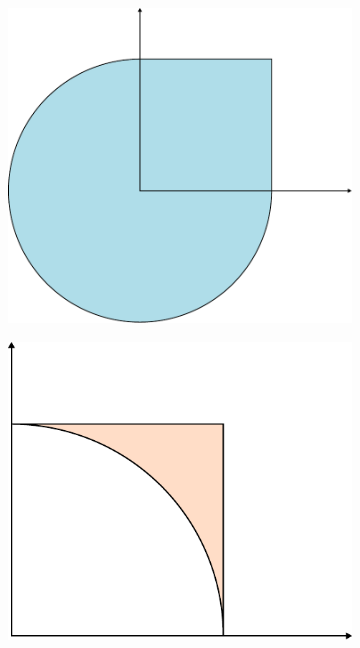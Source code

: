 \documentclass[11pt,a4paper]{article}
\begin{document}
\begin{itemize}
\begin{itemize}
\begin{figure}
\begin{subfigure}[b]{0.24\textwidth}
                \caption{}\label{fig:intersection}
            \end{subfigure}
            \begin{subfigure}[b]{0.24\textwidth}
                \includegraphics[width=\textwidth]{figures/SUD.pdf}
                \caption{}\label{fig:union}
            \end{subfigure}
            \begin{subfigure}[b]{0.24\textwidth}
                \includegraphics[width=\textwidth]{figures/difference.pdf}\label{fig:difference}

\end{subfigure}
\end{figure}
\end{itemize}
\end{itemize}
\end{document}
